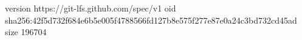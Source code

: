 version https://git-lfs.github.com/spec/v1
oid sha256:42f5d732f684e6b5e005f4788566fd127b8e575f277e87e0a24c3bd732cd45ad
size 196704
